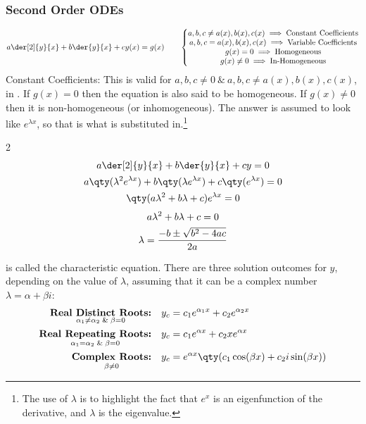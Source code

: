 \subsubsection{Second Order ODEs}
        \begin{align*}
            a\der[2]{y}{x}+b\der{y}{x}+cy(x)=g(x)\quad\quad
            \left\{
            \begin{matrix}
                a,b,c\neq a(x),b(x),c(x) \implies\text{Constant Coefficients}\\
                a,b,c = a(x),b(x),c(x) \implies\text{Variable Coefficients}\\
                g(x)=0\implies\text{Homogeneous}\\
                g(x)\neq0\implies\text{In-Homogeneous}
            \end{matrix}
            \right.
        \end{align*}
    Constant Coefficients:
    This is valid for $a,b,c\neq0\ \&\  a,b,c\neq a(x),b(x),c(x)$, in . If $g(x)=0$ then the equation is also said to be homogeneous. If $g(x)\neq0$ then it is non-homogeneous (or inhomogeneous). The answer is assumed to look like $e^{\lambda x}$, so that is what is substituted in.\footnote{The use of $\lambda$ is to highlight the fact that $e^x$ is an eigenfunction of the derivative, and $\lambda$ is the eigenvalue.}
    \begin{multicols}{2}\raggedcolumns
            \begin{gather*}
                a\der[2]{y}{x}+b\der{y}{x}+cy=0
                \\
                a\qty(\lambda^2e^{\lambda x})+b\qty(\lambda e^{\lambda x})+c\qty(e^{\lambda x})=0
                \\
                \qty(a\lambda^2+b\lambda+c)e^{\lambda x}=0
            \end{gather*}
            \begin{gather}
                a\lambda^2+b\lambda+c=0 \label{eqn:chareqn}
                \\
                \lambda=\frac{-b\pm\sqrt{b^2-4ac}}{2a}\notag
            \end{gather}
    \end{multicols}
     is called the characteristic equation.
    There are three solution outcomes for $y$, depending on the value of $\lambda$, assuming that it can be a complex number $\lambda=\alpha+\beta i$:
        \begin{align}
            \underset { \alpha_1 \neq \alpha_2\And \beta=0 }{\textbf{Real Distinct Roots:}}&& y_c&=c_1e^{\alpha_1x}+c_2e^{\alpha_2x}\label{eqn:realdistinctroots}
            \\
            \underset{\alpha_1=\alpha_2 \And \beta=0 }{\textbf{Real Repeating Roots:}}&& y_c&=c_1e^{\alpha x}+c_2xe^{\alpha x}\label{eqn:realrepeatroots}
            \\
            \underset{\beta \neq 0}{\textbf{Complex Roots:}}&& y_c&=e^{\alpha x}\qty(c_1\cos(\beta x)+c_2i\sin(\beta x))\label{eqn:complexroots}
        \end{align}
